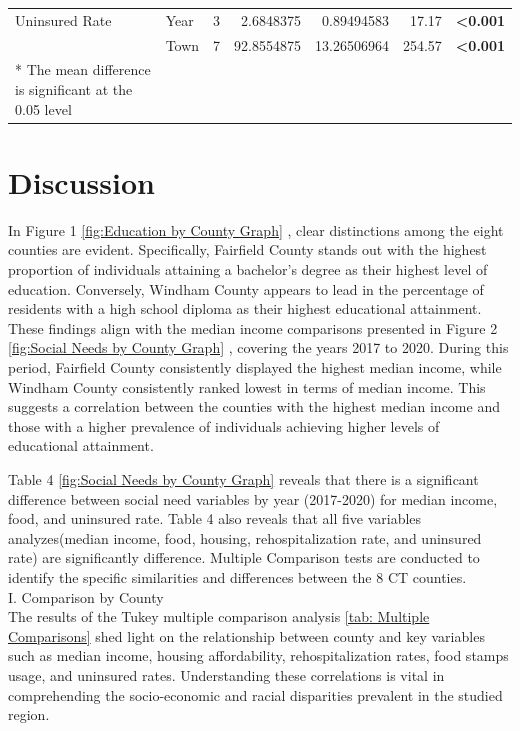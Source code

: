 \documentclass[12pt]{article}
\begin{document}
\begin{table}[]
{\begin{tabular}{llrrrrl}
  Uninsured Rate         & Year                   & 3                               & 2.6848375                                   & 0.89494583                               & 17.17                                & \textbf{\textless0.001}                     \\
                         & Town                   & 7                               & 92.8554875                                  & 13.26506964                              & 254.57                               & \textbf{\textless0.001}    \\                
  * The mean difference is significant at the 0.05 level\\
  \end{tabular}%
  }
  \end{table}

\section{Discussion}\label{sec:disc}


In Figure 1
\ref{fig:Education by County Graph}
, clear distinctions among the eight counties are evident. 
Specifically, Fairfield County stands out with the highest proportion of individuals attaining a bachelor's 
degree as their highest level of education. Conversely, Windham County appears to lead in the percentage of 
residents with a high school diploma as their highest educational attainment. These findings align with the median income 
comparisons presented in Figure 2
\ref{fig:Social Needs by County Graph}
, covering the years 2017 to 2020. 
During this period, Fairfield County consistently displayed the highest median income, while Windham County 
consistently ranked lowest in terms of median income. This suggests a correlation between the counties with the 
highest median income and those with a higher prevalence of individuals achieving higher levels of educational attainment.


Table 4
\ref{fig:Social Needs by County Graph}
 reveals that there is a significant difference between 
social need variables by year (2017-2020) for median income, food, and uninsured rate. Table 4 also 
reveals that all five variables analyzes(median income, food, housing, rehospitalization rate, and 
uninsured rate) are significantly difference. Multiple Comparison tests are conducted to identify the 
specific similarities and differences between the 8 CT counties.
\\
I. Comparison by County
\\
The results of the Tukey multiple comparison analysis
\ref{tab: Multiple Comparisons}
 shed light on the relationship between county and key 
variables such as median income, housing affordability, rehospitalization rates, food stamps usage, and
uninsured rates. Understanding these correlations is vital in comprehending 
the socio-economic and racial disparities prevalent in the studied region.
\end{document}
